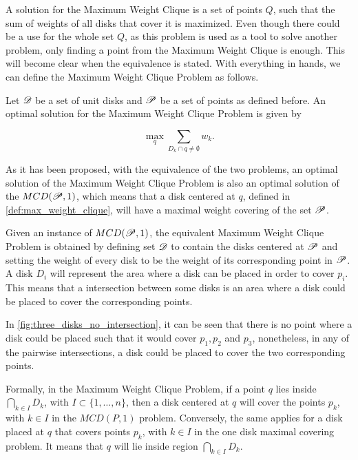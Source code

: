 A solution for the Maximum Weight Clique is a set of points $Q$, such that the sum of weights of all disks that cover it is maximized. Even though there could be a use for the whole set $Q$, as this problem is used as a tool to solve another problem, only finding a point from the Maximum Weight Clique is enough. This will become clear when the equivalence is stated. With everything in hands, we can define the Maximum Weight Clique Problem as follows.

\begin{definicao}\label{def:max_weight_clique}
    Let $\mathscr{D}$ be a set of unit disks and $\mathscr{P}$ be a set of points as defined before. An optimal solution for the Maximum Weight Clique Problem is given by 
    
    \begin{equation}
        \max_q \sum_{D_k \cap q \neq \emptyset} w_k.
    \end{equation}

\end{definicao}



As it has been proposed, with the equivalence of the two problems, an optimal solution of the Maximum Weight Clique Problem is also an optimal solution of the $MCD(\mathscr{P},1)$, which means that a disk centered at $q$, defined in \autoref{def:max_weight_clique}, will have a maximal weight covering of the set $\mathscr{P}$.

Given an instance of $MCD(\mathscr{P},1)$, the equivalent Maximum Weight Clique Problem is obtained by defining set $\mathscr{D}$ to contain the disks centered at $\mathscr{P}$ and setting the weight of every disk to be the weight of its corresponding point in $\mathscr{P}$. A disk $D_i$ will represent the area where a disk can be placed in order to cover $p_i$. This means that a intersection between some disks is an area where a disk could be placed to cover the corresponding points.

In \autoref{fig:three_disks_no_intersection}, it can be seen that there is no point where a disk could be placed such that it would cover $p_1, p_2$ and $p_3$, nonetheless, in any of the pairwise intersections, a disk could be placed to cover the two corresponding points.

Formally, in the Maximum Weight Clique Problem, if a point $q$ lies inside $\bigcap_{k \in I} D_k$, with $I \subset \{1,\dots,n\}$, then a disk centered at $q$ will cover the points $p_k$, with $k\in I$ in the $MCD(P,1)$ problem. Conversely, the same applies for a disk placed at $q$ that covers points $p_k$, with $k \in I$ in the one disk maximal covering problem. It means that $q$ will lie inside region $\bigcap_{k \in I} D_k$.

